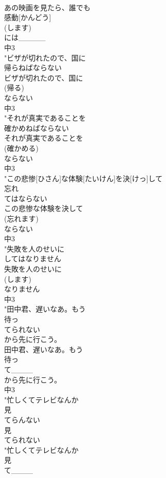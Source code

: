 \documentclass[8pt]{extreport}
\begin{document}
\begin{CJK}{UTF8}{min}
\\	あの映画を見たら、誰でも
\\	感動[かんどう]
\\	(します)
\\	には_____
\\	中3
\\	"ビザが切れたので、国に
\\	帰らねばならない
\\	ビザが切れたので、国に
\\	(帰る)
\\	ならない
\\	中3
\\	"それが真実であることを
\\	確かめねばならない
\\	それが真実であることを
\\	(確かめる)
\\	ならない
\\	中3
\\	"この悲惨[ひさん]な体験[たいけん]を決[けっ]して
\\	忘れ
\\	てはならない
\\	この悲惨な体験を決して
\\	(忘れます)
\\	ならない
\\	中3
\\	"失敗を人のせいに
\\	してはなりません
\\	失敗を人のせいに
\\	(します)
\\	なりません
\\	中3
\\	"田中君、遅いなあ。もう
\\	待っ
\\	てられない
\\	から先に行こう。
\\	田中君、遅いなあ。もう
\\	待っ
\\	て____
\\	から先に行こう。
\\	中3
\\	"忙しくてテレビなんか
\\	見
\\	てらんない
\\	見
\\	てられない
\\	"忙しくてテレビなんか
\\	見
\\	て____

\end{CJK}
\end{document}
